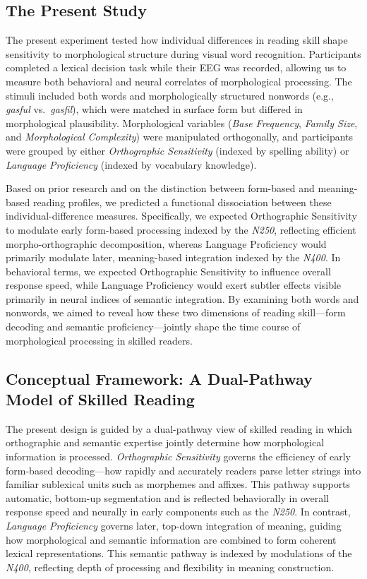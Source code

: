\documentclass[preprint,12pt, authoryear, review]{elsarticle}
\begin{document}
\subsection{The Present Study}

The present experiment tested how individual differences in reading skill shape sensitivity to morphological structure during visual word recognition. Participants completed a lexical decision task while their EEG was recorded, allowing us to measure both behavioral and neural correlates of morphological processing. The stimuli included both words and morphologically structured nonwords (e.g., \textit{gasful} vs.~\textit{gasfil}), which were matched in surface form but differed in morphological plausibility. Morphological variables (\textit{Base Frequency}, \textit{Family Size}, and \textit{Morphological Complexity}) were manipulated orthogonally, and participants were grouped by either \textit{Orthographic Sensitivity} (indexed by spelling ability) or \textit{Language Proficiency} (indexed by vocabulary knowledge).

Based on prior research and on the distinction between form-based and meaning-based reading profiles, we predicted a functional dissociation between these individual-difference measures. Specifically, we expected Orthographic Sensitivity to modulate early form-based processing indexed by the \textit{N250}, reflecting efficient morpho-orthographic decomposition, whereas Language Proficiency would primarily modulate later, meaning-based integration indexed by the \textit{N400}. In behavioral terms, we expected Orthographic Sensitivity to influence overall response speed, while Language Proficiency would exert subtler effects visible primarily in neural indices of semantic integration. By examining both words and nonwords, we aimed to reveal how these two dimensions of reading skill—form decoding and semantic proficiency—jointly shape the time course of morphological processing in skilled readers.

\subsection{Conceptual Framework: A Dual-Pathway Model of Skilled Reading}

The present design is guided by a dual-pathway view of skilled reading in which orthographic and semantic expertise jointly determine how morphological information is processed. \textit{Orthographic Sensitivity} governs the efficiency of early form-based decoding—how rapidly and accurately readers parse letter strings into familiar sublexical units such as morphemes and affixes. This pathway supports automatic, bottom-up segmentation and is reflected behaviorally in overall response speed and neurally in early components such as the \textit{N250}. In contrast, \textit{Language Proficiency} governs later, top-down integration of meaning, guiding how morphological and semantic information are combined to form coherent lexical representations. This semantic pathway is indexed by modulations of the \textit{N400}, reflecting depth of processing and flexibility in meaning construction. 
\end{document}
